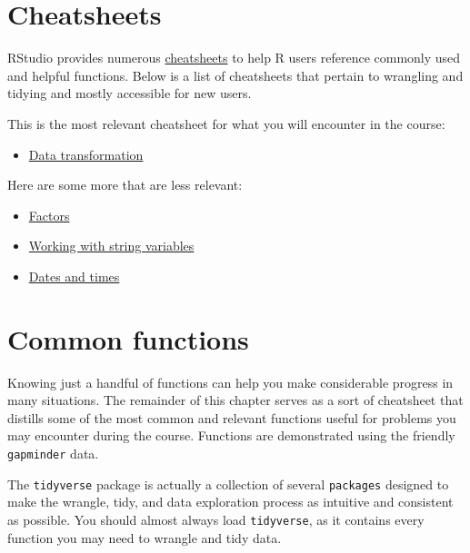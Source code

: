 \documentclass[
]{book}
\providecommand{\tightlist}{%
  \setlength{\itemsep}{0pt}\setlength{\parskip}{0pt}}
\begin{document}
\hypertarget{cheatsheets}{%
\section{Cheatsheets}\label{cheatsheets}}

RStudio provides numerous \href{https://rstudio.com/resources/cheatsheets/}{cheatsheets} to help R users reference commonly used and helpful functions. Below is a list of cheatsheets that pertain to wrangling and tidying and mostly accessible for new users.

This is the most relevant cheatsheet for what you will encounter in the course:

\begin{itemize}
\tightlist
\item
  \href{https://github.com/rstudio/cheatsheets/raw/master/data-transformation.pdf}{Data transformation}
\end{itemize}

Here are some more that are less relevant:

\begin{itemize}
\tightlist
\item
  \href{https://github.com/rstudio/cheatsheets/raw/master/factors.pdf}{Factors}
\item
  \href{https://github.com/rstudio/cheatsheets/raw/master/strings.pdf}{Working with string variables}
\item
  \href{https://github.com/rstudio/cheatsheets/raw/master/lubridate.pdf}{Dates and times}
\end{itemize}

\hypertarget{common-functions}{%
\section{Common functions}\label{common-functions}}

Knowing just a handful of functions can help you make considerable progress in many situations. The remainder of this chapter serves as a sort of cheatsheet that distills some of the most common and relevant functions useful for problems you may encounter during the course. Functions are demonstrated using the friendly \texttt{gapminder} data.

The \texttt{tidyverse} package is actually a collection of several \texttt{packages} designed to make the wrangle, tidy, and data exploration process as intuitive and consistent as possible. You should almost always load \texttt{tidyverse}, as it contains every function you may need to wrangle and tidy data.
\end{document}
